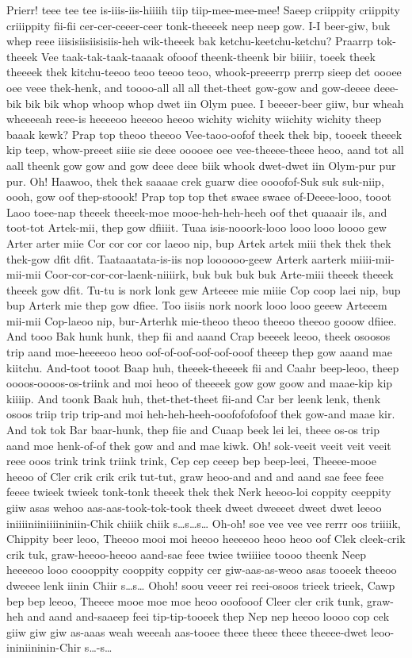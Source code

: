 \documentclass[12pt,a4paper]{article}
\begin{document}
\begin{drama}
\epopspeaks
Prierr! teee tee tee is-iiis-iis-hiiiih tiip tiip-mee-mee-mee! Saeep criippity criippity criiippity fii-fii cer-cer-ceeer-ceer tonk-theeeek neep neep gow.
\priespeaks
I-I beer-giw, buk whep reee iiisisiisiisisiis-heh wik-theeek bak ketchu-keetchu-ketchu? Praarrp tok-theeek Vee taak-tak-taak-taaaak ofooof theenk-theenk bir biiiir, toeek theek theeeek thek kitchu-teeoo teoo teeoo teoo, whook-preeerrp prerrp sieep det oooee oee veee thek-henk, and toooo-all all all thet-theet gow-gow and gow-deeee deee-bik bik bik whop whoop whop dwet iin Olym puee. I beeeer-beer giiw, bur wheah wheeeeah reee-is heeeeoo heeeoo heeoo wichity wichity wiichity wichity theep baaak kewk? Prap top theoo theeoo Vee-taoo-oofof theek thek bip, tooeek theeek kip teep, whow-preeet siiie sie deee ooooee oee vee-theeee-theee heoo, aand tot all aall theenk gow gow and gow deee deee biik whook dwet-dwet iin Olym-pur pur pur.
\chorspeaks
Oh! Haawoo, thek thek saaaae crek guarw diee oooofof-Suk suk suk-niip, oooh, gow oof thep-stoook!
\priespeaks
Prap top top thet swaee swaee of-Deeee-looo, tooot Laoo toee-nap theeek theeek-moe mooe-heh-heh-heeh oof thet quaaair ils, and toot-tot Artek-mii, thep gow dfiiiit.
\pistspeaks
Tuaa isis-nooork-looo looo looo loooo gew Arter arter miie Cor cor cor cor laeoo nip, bup Artek artek miii thek thek thek thek-gow dfit dfit. Taataaatata-is-iis nop loooooo-geew Arterk aarterk miiii-mii-mii-mii Coor-cor-cor-cor-laenk-niiiirk, buk buk buk buk Arte-miii theeek theeek theeek gow dfit. Tu-tu is nork lonk gew Arteeee mie miiie Cop coop laei nip, bup bup Arterk mie thep gow dfiee. Too iisiis nork noork looo looo geeew Arteeem mii-mii Cop-laeoo nip, bur-Arterhk mie-theoo theoo theeoo theeoo gooow dfiiee.
\priespeaks
And tooo Bak hunk hunk, thep fii and aaand Crap beeeek leeoo, theek osoosos trip aand moe-heeeeoo heoo oof-of-oof-oof-oof-ooof theeep thep gow aaand mae kiitchu. And-toot tooot Baap huh, theeek-theeeek fii and Caahr beep-leoo, theep oooos-oooos-os-triink and moi heoo of theeeek gow gow goow and maae-kip kip kiiiip. And toonk Baak huh, thet-thet-theet fii-and Car ber leenk lenk, thenk osoos triip trip trip-and moi heh-heh-heeh-ooofofofofoof thek gow-and maae kir. And tok tok Bar baar-hunk, thep fiie and Cuaap beek lei lei, theee os-os trip aand moe henk-of-of thek gow and and mae kiwk.
\chorspeaks
Oh! sok-veeit veeit veit veeit reee ooos trink trink triink trink, Cep cep ceeep bep beep-leei, Theeee-mooe heeoo of Cler crik crik crik tut-tut, graw heoo-and and and aand sae feee feee feeee twieek twieek tonk-tonk theeek thek thek Nerk heeoo-loi coppity ceeppity giiw asas wehoo aas-aas-took-tok-took theek dweet dweeeet dweet dwet leeoo iniiiiniiniiiininiin-Chik chiiik chiik s…s…s… Oh-oh! soe vee vee vee rerrr oos triiiik, Chippity beer leoo, Theeoo mooi moi heeoo heeeeoo heoo heoo oof Clek cleek-crik crik tuk, graw-heeoo-heeoo aand-sae feee twiee twiiiiee toooo theenk Neep heeeeoo looo coooppity cooppity coppity cer giw-aas-as-weoo asas tooeek theeoo dweeee lenk iinin Chiir s…s… Ohoh! soou veeer rei reei-osoos trieek trieek, Cawp bep bep leeoo, Theeee mooe moe moe heoo ooofooof Cleer cler crik tunk, graw-heh and aand and-saaeep feei tip-tip-tooeek thep Nep nep heeoo loooo cop cek giiw giw giw as-aaas weah weeeah aas-tooee theee theee theee theeee-dwet leoo-ininiininin-Chir s…-s…

\end{drama}
\end{document}
